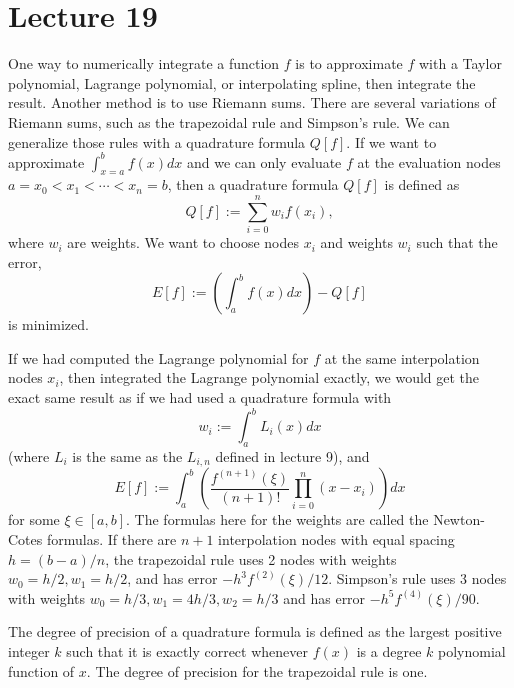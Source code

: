\documentclass{article}
\begin{document}
\section{Lecture 19}
One way to numerically integrate a function $f$ is to approximate $f$ with a Taylor polynomial, Lagrange polynomial, or interpolating spline, then integrate the result. Another method is to use Riemann sums. There are several variations of Riemann sums, such as the trapezoidal rule and Simpson's rule. We can generalize those rules with a quadrature formula $Q[f]$. If we want to approximate $\int_{x=a}^b f(x) dx$ and we can only evaluate $f$ at the evaluation nodes $a=x_0 < x_1 < \cdots < x_n=b$, then a quadrature formula $Q[f]$ is defined as
\[ Q[f] := \sum_{i=0}^n w_i f(x_i), \]
where $w_i$ are weights. We want to choose nodes $x_i$ and weights $w_i$ such that the error,
\[ E[f] := \left( \int_a^b f(x)dx \right) -Q[f] \]
is minimized.
\par
If we had computed the Lagrange polynomial for $f$ at the same interpolation nodes $x_i$, then integrated the Lagrange polynomial exactly, we would get the exact same result as if we had used a quadrature formula with
\[ w_i := \int_a^b L_i(x) dx \]
(where $L_i$ is the same as the $L_{i,n}$ defined in lecture 9), and
\[ E[f]:= \int_a^b \left( \frac{f^{(n+1)}(\xi)}{(n+1)!} \prod_{i=0}^n (x-x_i) \right) dx\]
for some $\xi \in [a,b]$. The formulas here for the weights are called the Newton-Cotes formulas. If there are $n+1$ interpolation nodes with equal spacing $h=(b-a)/n$, the trapezoidal rule uses 2 nodes with weights $w_0 = h/2, w_1=h/2$, and has error $-h^3 f^{(2)}(\xi)/12$. Simpson's rule uses 3 nodes with weights $w_0 = h/3, w_1=4h/3, w_2=h/3$ and has error $-h^5f^{(4)}(\xi)/90$.
\par
The degree of precision of a quadrature formula is defined as the largest positive integer $k$ such that it is exactly correct whenever $f(x)$ is a degree $k$ polynomial function of $x$. The degree of precision for the trapezoidal rule is one.
\end{document}
